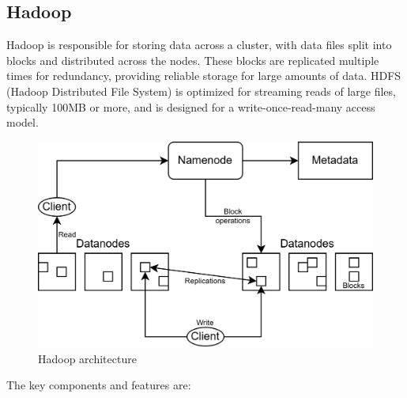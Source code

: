 \subsection{Hadoop}
Hadoop is responsible for storing data across a cluster, with data files split into blocks and distributed across the nodes.
These blocks are replicated multiple times for redundancy, providing reliable storage for large amounts of data. 
HDFS (Hadoop Distributed File System) is optimized for streaming reads of large files, typically 100MB or more, and is designed for a write-once-read-many access model.
\begin{figure}[H]
    \centering
    \includegraphics[width=0.75\linewidth]{images/hadoop.png}
    \caption{Hadoop architecture}
\end{figure}
The key components and features are: 
